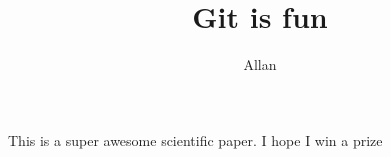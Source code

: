 \documentclass[10pt]{article}
\author{Allan}
\title{Git is fun}
\begin{document}
    \maketitle

    This is a super awesome scientific paper.
    I hope I win a prize
\end{document}
